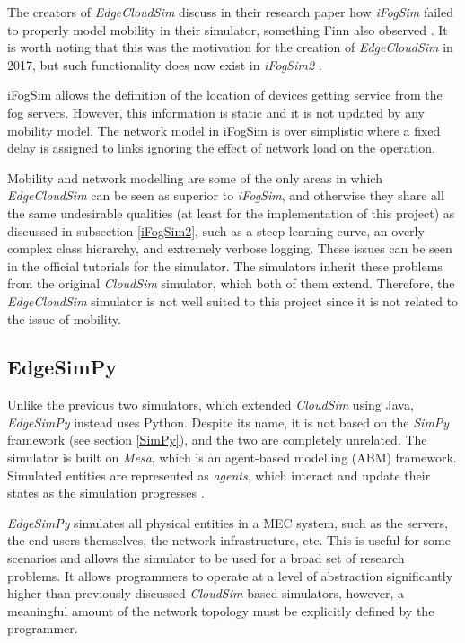 \documentclass[]{UCD_CS_FYP_Report}
\renewenvironment{leftbar}{%
    \def\FrameCommand{%
        {\color{gray}\vrule width 1pt}%
        \hspace{12pt}%
    }%
    \MakeFramed{%
        \advance\hsize-\width
        \FrameRestore
        \setlength{\parskip}{0pt}%
    }%
    \itshape
    \vspace{8pt}%
}{%
    \par\vspace{8pt}%
    \endMakeFramed
    \vspace{-\parskip}%
}
\begin{document}
The creators of \textit{EdgeCloudSim} discuss in their research paper how \textit{iFogSim} failed to properly model mobility in their simulator, something Finn also observed \cite{finn2026hepa}. It is worth noting that this was the motivation for the creation of \textit{EdgeCloudSim} in 2017, but such functionality does now exist in \textit{iFogSim2} \cite{ifogsim}.

\begin{leftbar}
     iFogSim allows the definition of the location of devices getting service from the fog servers. However, this information is static and it is not updated by any mobility model. The network model in iFogSim is over simplistic where a fixed delay is assigned to links ignoring the effect of network load on the operation. \cite{edgecloudsim2017}
\end{leftbar}

Mobility and network modelling are some of the only areas in which \textit{EdgeCloudSim} can be seen as superior to \textit{iFogSim}, and otherwise they share all the same  undesirable qualities (at least for the implementation of this project) as discussed in subsection \ref{iFogSim2}, such as a steep learning curve, an overly complex class hierarchy, and extremely verbose logging. These issues can be seen in the official tutorials for the simulator. The simulators inherit these problems from the original \textit{CloudSim} simulator, which both of them extend. Therefore, the \textit{EdgeCloudSim} simulator is not well suited to this project since it is not related to the issue of mobility.

\subsection{EdgeSimPy} \label{EdgeSimPy}
Unlike the previous two simulators, which extended \textit{CloudSim} using Java, \textit{EdgeSimPy} \cite{edgesimpy2023} instead uses Python. Despite its name, it is not based on the \textit{SimPy} framework (see section \ref{SimPy}), and the two are completely unrelated. The simulator is built on \textit{Mesa}, which is an agent-based modelling (ABM) framework. Simulated entities are represented as \textit{agents}, which interact and update their states as the simulation progresses \cite{mesa}.

\textit{EdgeSimPy} simulates all physical entities in a MEC system, such as the servers, the end users themselves, the network infrastructure, etc. This is useful for some scenarios and allows the simulator to be used for a broad set of research problems. It allows programmers to operate at a level of abstraction significantly higher than previously discussed \textit{CloudSim} based simulators, however, a meaningful amount of the network topology must be explicitly defined by the programmer.
\end{document}
